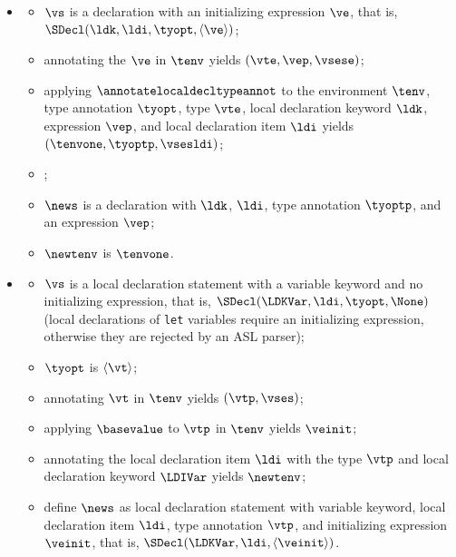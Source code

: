 \ProseParagraph
\OneApplies
\begin{itemize}
  \item {}
  \begin{itemize}
    \item $\vs$ is a declaration with an initializing expression $\ve$,
          that is, \\
          $\SDecl(\ldk, \ldi, \tyopt, \langle\ve\rangle)$;
    \item annotating the \rhsexpression{} $\ve$ in $\tenv$ yields $(\vte,\vep, \vsese)$\ProseOrTypeError;
    \item applying $\annotatelocaldecltypeannot$ to the environment $\tenv$, type annotation $\tyopt$, type $\vte$, local declaration keyword $\ldk$, expression $\vep$, and local declaration item $\ldi$ yields $(\tenvone, \tyoptp, \vsesldi)$\ProseOrTypeError;
    \item {};
    \item $\news$ is a declaration with $\ldk$, $\ldi$, type annotation $\tyoptp$, and an expression $\vep$;
    \item $\newtenv$ is $\tenvone$.
  \end{itemize}

  \item {}
  \begin{itemize}
  \item $\vs$ is a local declaration statement with a variable keyword and no initializing expression,
        that is, $\SDecl(\LDKVar, \ldi, \tyopt, \None)$ (local declarations of \texttt{let} variables require
        an initializing expression, otherwise they are rejected by an ASL parser);
  \item $\tyopt$ is $\langle\vt\rangle$\ProseOrTypeError;
  \item annotating $\vt$ in $\tenv$ yields $(\vtp, \vses)$\ProseOrTypeError;
  \item applying $\basevalue$ to $\vtp$ in $\tenv$ yields $\veinit$\ProseOrTypeError;
  \item annotating the local declaration item $\ldi$ with the type $\vtp$ and local declaration keyword $\LDIVar$
        yields $\newtenv$\ProseOrTypeError;
  \item define $\news$ as local declaration statement with variable keyword, local declaration item $\ldi$, type annotation $\vtp$, and initializing expression $\veinit$, that is, $\SDecl(\LDKVar, \ldi, \langle\veinit\rangle)$.
  \end{itemize}
\end{itemize}

